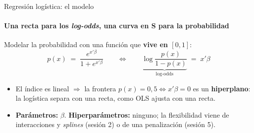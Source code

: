 \documentclass{beamer}
\newcommand{\1}{\mathbb{I}}
\begin{document}
\begin{frame}{Regresión logística: el modelo}
\framesubtitle{Una recta para los \emph{log-odds}, una curva en S para la probabilidad}
\small
Modelar la probabilidad con una función que \textbf{vive en $[0,1]$}:
\[ p(x) \;=\; \frac{e^{x'\beta}}{1 + e^{x'\beta}} \qquad \Longleftrightarrow \qquad \underbrace{\log \frac{p(x)}{1 - p(x)}}_{\text{log-odds}} \;=\; x'\beta \]
\begin{center}
\end{center}
\pause
\begin{itemize}\itemsep2pt
  \item El índice es lineal $\Rightarrow$ la frontera $p(x) = 0{,}5 \iff x'\beta = 0$ es un \textbf{hiperplano}: la logística separa con una recta, como OLS ajusta con una recta.
  \item \textbf{Parámetros:} $\beta$. \textbf{Hiperparámetros:} ninguno; la flexibilidad viene de interacciones y \emph{splines} (sesión 2) o de una penalización (sesión 5).
\end{itemize}
\end{frame}
\end{document}
